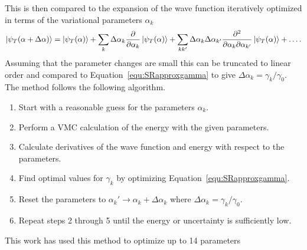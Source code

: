 This is then compared to the expansion of the wave function iteratively optimized in terms of the variational parameters $\alpha_k$
\begin{equation}
   \left| \psi_T(\alpha+\Delta\alpha) \right> = \left| \psi_T(\alpha) \right> + \sum\limits_k \Delta\alpha_k \frac{\partial}{\partial\alpha_k}\left| \psi_T(\alpha) \right> + \sum\limits_{kk'} \Delta\alpha_k\Delta\alpha_{k'} \frac{\partial^2}{\partial\alpha_k\partial\alpha_{k'}}\left| \psi_T(\alpha) \right> + \ldots.
\end{equation}
Assuming that the parameter changes are small this can be truncated to linear order and compared to Equation~\ref{equ:SRapproxgamma} to give $\Delta\alpha_k = \gamma_k/\gamma_0$. The method follows the following algorithm.
\begin{enumerate}
   \item Start with a reasonable guess for the parameters $\alpha_k$.
   \item Perform a VMC calculation of the energy with the given parameters.
   \item Calculate derivatives of the wave function and energy with respect to the parameters.
   \item Find optimal values for $\gamma_k$ by optimizing Equation~\ref{equ:SRapproxgamma}.
   \item Reset the parameters to $\alpha_k' \rightarrow \alpha_k + \Delta\alpha_k$ where $\Delta\alpha_k = \gamma_k/\gamma_0$.
   \item Repeat steps 2 through 5 until the energy or uncertainty is sufficiently low.
\end{enumerate}
This work has used this method to optimize up to 14 parameters

